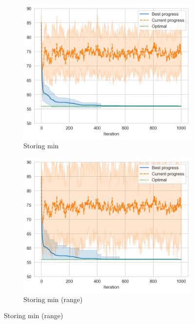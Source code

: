 \begin{figure}[ht]
    \centering
    \hfill
    \begin{subfigure}{0.48\textwidth}
        \centering
        \includegraphics[width=\textwidth]{../images/p4/store-min.png}
        \caption{Storing min}
    \end{subfigure}
    \hfill
    \begin{subfigure}{0.48\textwidth}
        \centering
        \includegraphics[width=\textwidth]{../images/p4/store-min-pi.png}
        \caption{Storing min (range)}
    \end{subfigure}
    \hfill


\end{figure}
